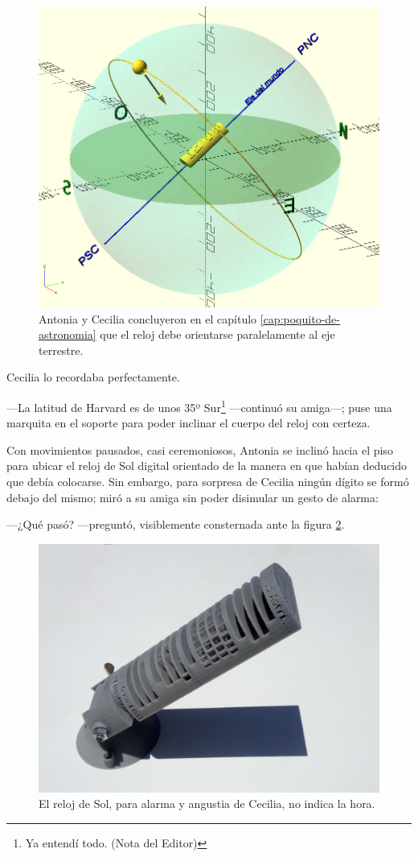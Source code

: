 \begin{figure}[ht]
  \centering
  \includegraphics[width=.6\textwidth]{imagenes/orientacion-reloj.png}
  \caption{Antonia y Cecilia concluyeron en el capítulo
    \ref{cap:poquito-de-astronomia} que el reloj debe orientarse
    paralelamente al eje terrestre.}
  \label{fig:orientacion-reloj-apendice}
\end{figure}

Cecilia lo recordaba perfectamente.

---La latitud de Harvard es de unos 35º Sur\footnote{Ya entendí
  todo. (Nota del Editor)} ---con\-ti\-nuó su amiga---; puse una
marquita en el soporte para poder inclinar el cuerpo del reloj con
certeza.

Con movimientos pausados, casi ceremoniosos, Antonia se inclinó hacia
el piso para ubicar el reloj de Sol digital orientado de la manera en
que habían deducido que debía colocarse. Sin embargo, para sorpresa de
Cecilia ningún dígito se formó debajo del mismo; miró a su amiga sin
poder disimular un gesto de alarma:

---¿Qué pasó? ---preguntó, visiblemente consternada ante la 
figura \ref{fig:reloj-solsticio-mal}.

\begin{figure}[ht]
  \centering
  \includegraphics[width=.65\textwidth]{imagenes/reloj-solsticio-mal}
  \caption{El reloj de Sol, para alarma y angustia de Cecilia, no
    indica la hora.}%
  \label{fig:reloj-solsticio-mal}
\end{figure}

